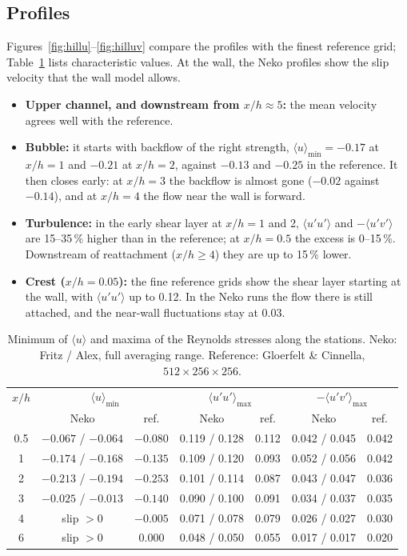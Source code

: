 \documentclass[11pt,a4paper]{article}
\begin{document}
\subsection{Profiles}

Figures~\ref{fig:hillu}--\ref{fig:hilluv} compare the profiles with the
finest reference grid; Table~\ref{tab:hillprof} lists characteristic values.
At the wall, the Neko profiles show the slip velocity that the wall model
allows.

\begin{itemize}
  \item \textbf{Upper channel, and downstream from $x/h \approx 5$:} the
    mean velocity agrees well with the reference.
  \item \textbf{Bubble:} it starts with backflow of the right strength,
    $\langle u\rangle_{\min} = -0.17$ at $x/h = 1$ and $-0.21$ at $x/h = 2$,
    against $-0.13$ and $-0.25$ in the reference. It then closes early: at
    $x/h = 3$ the backflow is almost gone ($-0.02$ against $-0.14$), and at
    $x/h = 4$ the flow near the wall is forward.
  \item \textbf{Turbulence:} in the early shear layer at $x/h = 1$ and 2,
    $\langle u'u'\rangle$ and $-\langle u'v'\rangle$ are 15--35\,\% higher
    than in the reference; at $x/h = 0.5$ the excess is 0--15\,\%.
    Downstream of reattachment ($x/h \ge 4$) they are up to 15\,\% lower.
  \item \textbf{Crest ($x/h = 0.05$):} the fine reference grids show the
    shear layer starting at the wall, with $\langle u'u'\rangle$ up to 0.12.
    In the Neko runs the flow there is still attached, and the near-wall
    fluctuations stay at 0.03.
\end{itemize}

\begin{table}[htbp]
\centering
\small
\caption{Minimum of $\langle u\rangle$ and maxima of the Reynolds stresses
along the stations. Neko: Fritz / Alex, full averaging range. Reference:
Gloerfelt \& Cinnella, $512\times256\times256$.}
\label{tab:hillprof}
\begin{tabular}{@{}ccccccc@{}}
\toprule
$x/h$ & \multicolumn{2}{c}{$\langle u\rangle_{\min}$} &
\multicolumn{2}{c}{$\langle u'u'\rangle_{\max}$} &
\multicolumn{2}{c}{$-\langle u'v'\rangle_{\max}$} \\
 & Neko & ref. & Neko & ref. & Neko & ref. \\
\midrule
0.5 & $-0.067$ / $-0.064$ & $-0.080$ & 0.119 / 0.128 & 0.112 & 0.042 / 0.045 & 0.042 \\
1 & $-0.174$ / $-0.168$ & $-0.135$ & 0.109 / 0.120 & 0.093 & 0.052 / 0.056 & 0.042 \\
2 & $-0.213$ / $-0.194$ & $-0.253$ & 0.101 / 0.114 & 0.087 & 0.043 / 0.047 & 0.036 \\
3 & $-0.025$ / $-0.013$ & $-0.140$ & 0.090 / 0.100 & 0.091 & 0.034 / 0.037 & 0.035 \\
4 & slip $>0$ & $-0.005$ & 0.071 / 0.078 & 0.079 & 0.026 / 0.027 & 0.030 \\
6 & slip $>0$ & 0.000 & 0.048 / 0.050 & 0.055 & 0.017 / 0.017 & 0.020 \\
\bottomrule
\end{tabular}
\end{table}
\end{document}
